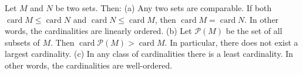 Let $M$ and $N$ be two sets. Then:
(a) Any two sets are comparable. If both $\operatorname{card} M \leqslant \operatorname{card} N$ and $\operatorname{card} N \leqslant \operatorname{card} M$, then $\operatorname{card} M = \operatorname{card} N$. In other words, the cardinalities are linearly ordered.
(b) Let $\mathcal{P}(M)$ be the set of all subsets of $M$. Then $\operatorname{card} \mathcal{P}(M) > \operatorname{card} M$. In particular, there does not exist a largest cardinality.
(c) In any class of cardinalities there is a least cardinality. In other words, the cardinalities are well-ordered.
